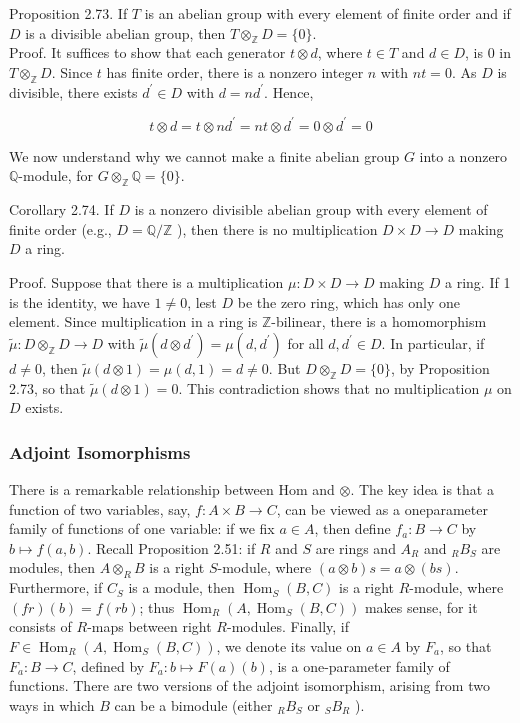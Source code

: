 \documentclass[10pt]{article}
\begin{document}
Proposition 2.73. If $T$ is an abelian group with every element of finite order and if $D$ is a divisible abelian group, then $T \otimes_{\mathbb{Z}} D=\{0\}$.\\
Proof. It suffices to show that each generator $t \otimes d$, where $t \in T$ and $d \in D$, is 0 in $T \otimes_{\mathbb{Z}} D$. Since $t$ has finite order, there is a nonzero integer $n$ with $n t=0$. As $D$ is divisible, there exists $d^{\prime} \in D$ with $d=n d^{\prime}$. Hence,

$$
t \otimes d=t \otimes n d^{\prime}=n t \otimes d^{\prime}=0 \otimes d^{\prime}=0
$$

We now understand why we cannot make a finite abelian group $G$ into a nonzero $\mathbb{Q}$-module, for $G \otimes_{\mathbb{Z}} \mathbb{Q}=\{0\}$.

Corollary 2.74. If $D$ is a nonzero divisible abelian group with every element of finite order (e.g., $D=\mathbb{Q} / \mathbb{Z}$ ), then there is no multiplication $D \times D \rightarrow D$ making $D$ a ring.

Proof. Suppose that there is a multiplication $\mu: D \times D \rightarrow D$ making $D$ a ring. If 1 is the identity, we have $1 \neq 0$, lest $D$ be the zero ring, which has only one element. Since multiplication in a ring is $\mathbb{Z}$-bilinear, there is a homomorphism $\tilde{\mu}: D \otimes_{\mathbb{Z}} D \rightarrow D$ with $\tilde{\mu}\left(d \otimes d^{\prime}\right)=\mu\left(d, d^{\prime}\right)$ for all $d, d^{\prime} \in D$. In particular, if $d \neq 0$, then $\widetilde{\mu}(d \otimes 1)=\mu(d, 1)=d \neq 0$. But $D \otimes_{\mathbb{Z}} D=\{0\}$, by Proposition 2.73, so that $\widetilde{\mu}(d \otimes 1)=0$. This contradiction shows that no multiplication $\mu$ on $D$ exists.

\subsubsection*{Adjoint Isomorphisms}
There is a remarkable relationship between Hom and $\otimes$. The key idea is that a function of two variables, say, $f: A \times B \rightarrow C$, can be viewed as a oneparameter family of functions of one variable: if we fix $a \in A$, then define $f_{a}: B \rightarrow C$ by $b \mapsto f(a, b)$. Recall Proposition 2.51: if $R$ and $S$ are rings and $A_{R}$ and ${ }_{R} B_{S}$ are modules, then $A \otimes_{R} B$ is a right $S$-module, where $(a \otimes b) s=a \otimes(b s)$. Furthermore, if $C_{S}$ is a module, then $\operatorname{Hom}_{S}(B, C)$ is a right $R$-module, where $(f r)(b)=f(r b)$; thus $\operatorname{Hom}_{R}\left(A, \operatorname{Hom}_{S}(B, C)\right)$ makes sense, for it consists of $R$-maps between right $R$-modules. Finally, if $F \in \operatorname{Hom}_{R}\left(A, \operatorname{Hom}_{S}(B, C)\right)$, we denote its value on $a \in A$ by $F_{a}$, so that $F_{a}: B \rightarrow C$, defined by $F_{a}: b \mapsto F(a)(b)$, is a one-parameter family of functions. There are two versions of the adjoint isomorphism, arising from two ways in which $B$ can be a bimodule (either ${ }_{R} B_{S}$ or ${ }_{S} B_{R}$ ).
\end{document}
